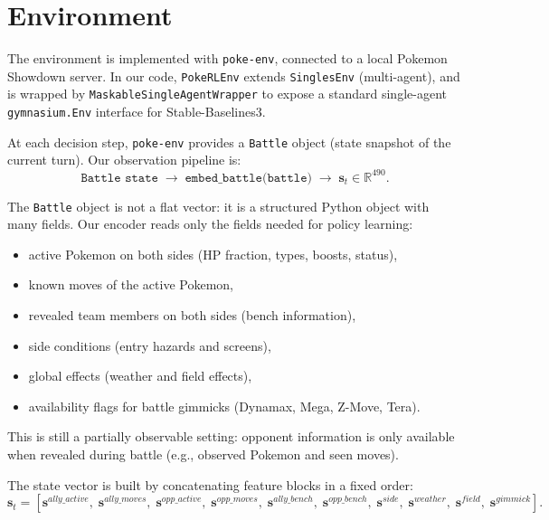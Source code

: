 \section{Environment}
\label{section:environment}

The environment is implemented with \texttt{poke-env}, connected to a local Pokemon Showdown server.
In our code, \texttt{PokeRLEnv} extends \texttt{SinglesEnv} (multi-agent), and is wrapped by
\texttt{MaskableSingleAgentWrapper} to expose a standard single-agent \texttt{gymnasium.Env}
interface for Stable-Baselines3.

At each decision step, \texttt{poke-env} provides a \texttt{Battle} object (state snapshot of the
current turn). Our observation pipeline is:
\[
\texttt{Battle state} \;\longrightarrow\; \texttt{embed\_battle(battle)} \;\longrightarrow\; \mathbf{s}_t \in \mathbb{R}^{490}.
\]

The \texttt{Battle} object is not a flat vector: it is a structured Python object with many fields.
Our encoder reads only the fields needed for policy learning:
\begin{itemize}
	\item active Pokemon on both sides (HP fraction, types, boosts, status),
	\item known moves of the active Pokemon,
	\item revealed team members on both sides (bench information),
	\item side conditions (entry hazards and screens),
	\item global effects (weather and field effects),
	\item availability flags for battle gimmicks (Dynamax, Mega, Z-Move, Tera).
\end{itemize}

This is still a partially observable setting: opponent information is only available when revealed
during battle (e.g., observed Pokemon and seen moves).

The state vector is built by concatenating feature blocks in a fixed order:
\[
\mathbf{s}_t = [\mathbf{s}^{ally\_active},\; \mathbf{s}^{ally\_moves},\; \mathbf{s}^{opp\_active},\; \mathbf{s}^{opp\_moves},\; \mathbf{s}^{ally\_bench},\; \mathbf{s}^{opp\_bench},\; \mathbf{s}^{side},\; \mathbf{s}^{weather},\; \mathbf{s}^{field},\; \mathbf{s}^{gimmick}].
\]

